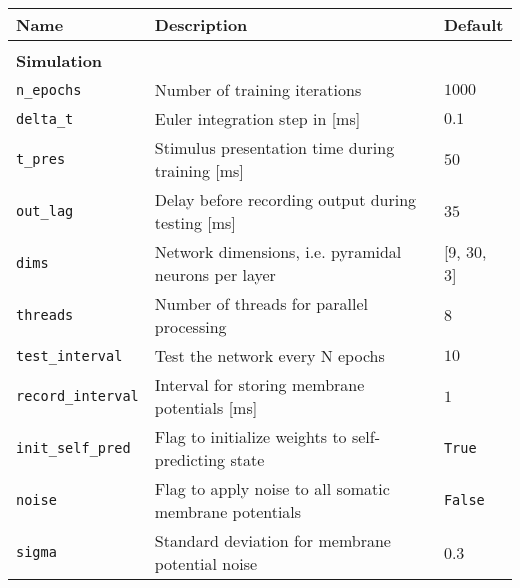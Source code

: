 \begin{table}
  \fontsize{12pt}{12pt}\selectfont
  \begin{center}
    \begin{tabular}{p{}p{}p{}}    \hline
      \textbf{Name}                & \textbf{Description}                                                        &
      \textbf{Default}
      \\
      \hline

      \\\textbf{Simulation} \\\hline
      \texttt{n\_epochs}           & Number of training iterations                                               &
      $1000$
      \\
      \texttt{delta\_t}            & Euler integration step in [ms]                                              & $0.1$
      \\
      \texttt{t\_pres}             & Stimulus presentation time during training [ms]                             & $50$
      \\
      \texttt{out\_lag}            & Delay before recording output during testing [ms]                           &
      $35$                                                                                                                        \\
      \texttt{dims}                & Network dimensions, i.e. pyramidal neurons per layer                        & [9,
          30, 3]
      \\
      \texttt{threads}             & Number of threads for parallel processing                                   & $8$
      \\
      \texttt{test\_interval}      & Test the network every N epochs                                             & $10$
      \\
      \texttt{record\_interval}    & Interval for storing membrane potentials [ms]                               & $1$
      \\
      \texttt{init\_self\_pred}    & Flag to initialize weights to self-predicting state                         &
      \texttt{True}
      \\
      \texttt{noise}               & Flag to apply noise to all somatic membrane potentials                      & \texttt{False} \\
      \texttt{sigma}               & Standard deviation for membrane potential noise                             & 0.3
      \\

\end{tabular}
\end{center}
\end{table}
